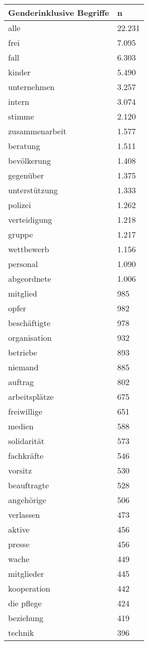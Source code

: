 
\begin{tabular}{ll}
\toprule
Genderinklusive Begriffe & n\\
\midrule
alle & 22.231\\
frei & 7.095\\
fall & 6.303\\
kinder & 5.490\\
unternehmen & 3.257\\
intern & 3.074\\
stimme & 2.120\\
zusammenarbeit & 1.577\\
beratung & 1.511\\
bevölkerung & 1.408\\
gegenüber & 1.375\\
unterstützung & 1.333\\
polizei & 1.262\\
verteidigung & 1.218\\
gruppe & 1.217\\
wettbewerb & 1.156\\
personal & 1.090\\
abgeordnete & 1.006\\
mitglied & 985\\
opfer & 982\\
beschäftigte & 978\\
organisation & 932\\
betriebe & 893\\
niemand & 885\\
auftrag & 802\\
arbeitsplätze & 675\\
freiwillige & 651\\
medien & 588\\
solidarität & 573\\
fachkräfte & 546\\
vorsitz & 530\\
beauftragte & 528\\
angehörige & 506\\
verlassen & 473\\
aktive & 456\\
presse & 456\\
wache & 449\\
mitglieder & 445\\
kooperation & 442\\
die pflege & 424\\
beziehung & 419\\
technik & 396\\

\end{tabular}
